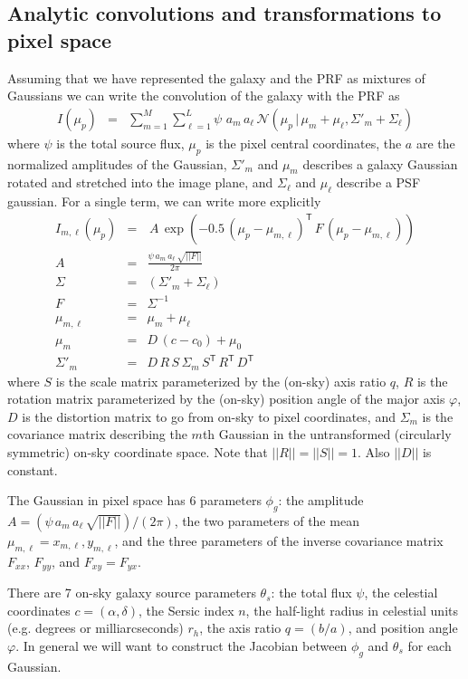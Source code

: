 \documentclass[modern]{aastex6}
\newcommand{\transpose}[1]{{#1}^{\!\mathsf T}}
\newcommand{\given}{\,|\,}
\renewcommand{\det}[1]{||{#1}||}
\newcommand{\normal}{\mathcal{N}}
\begin{document}
\subsection{Analytic convolutions and transformations to pixel space}
Assuming that we have represented the galaxy and the PRF as mixtures of Gaussians we can write the convolution of the galaxy with the PRF as
\begin{eqnarray}
I(\mu_p) & = & \sum_{m=1}^M \sum_{\ell=1}^L \psi \, \, a_m \, a_\ell \, \normal(\mu_p \given \mu_m + \mu_\ell, \Sigma'_m + \Sigma_\ell)
\end{eqnarray}
where $\psi$ is the total source flux,
$\mu_p$ is the pixel central coordinates,
the $a$ are the normalized amplitudes of the Gaussian,
$\Sigma'_m$  and $\mu_m$ describes a galaxy Gaussian rotated and stretched into the image plane,
and $\Sigma_\ell$ and $\mu_\ell$ describe a PSF gaussian.
For a single term, we can write more explicitly
\begin{eqnarray}
I_{m, \ell}(\mu_p) & = & \, A  \, \exp(-0.5 \, \transpose{(\mu_p -\mu_{m,\ell})} \, F \, (\mu_p -\mu_{m,\ell})) \\
A & = & \frac{ \psi \, a_m \, a_\ell \, \sqrt{\det{F}}}{2\pi} \\
\Sigma & = & (\Sigma'_m + \Sigma_\ell) \nonumber \\
 F & = & \Sigma^{-1} \nonumber \\
\mu_{m,\ell} & = & \mu_m + \mu_\ell \nonumber \\
\mu_m & = & D\, (c - c_0) + \mu_0 \nonumber \\  
\Sigma'_m & = & D\, R \, S \, \Sigma_m \, \transpose{S} \, \transpose{R} \, \transpose{D}\nonumber 
\end{eqnarray}
where $S$ is the scale matrix parameterized by the (on-sky) axis ratio $q$,
$R$ is the rotation matrix parameterized by the (on-sky) position angle of the major axis $\varphi$, 
$D$ is the distortion matrix to go from on-sky to pixel coordinates,
and $\Sigma_m$ is the covariance matrix describing the $m$th Gaussian in the untransformed (circularly symmetric) on-sky coordinate space.
Note that $\det{R}=\det{S}=1$.
Also $\det{D}$ is constant.

The Gaussian in pixel space has 6 parameters $\phi_g$:
the amplitude $A = (\psi \, a_m \, a_\ell \, \sqrt{\det{F}})/(2\pi)$,
the two parameters of the mean $\mu_{m,\ell} = x_{m, \ell}, y_{m, \ell}$,
and the three parameters of the inverse covariance matrix $F_{xx}$,
$F_{yy}$,
and $F_{xy}=F_{yx}$.

There are 7 on-sky galaxy source parameters $\theta_s$:
the total flux $\psi$,
the celestial coordinates $c= (\alpha, \delta)$,
the Sersic index $n$, 
the half-light radius in  celestial units (e.g. degrees or milliarcseconds) $r_h$,
the axis ratio $q = (b/a)$,
and position angle $\varphi$.
In general we will want to construct the Jacobian between $\phi_g$ and $\theta_s$ for each Gaussian.
\end{document}
